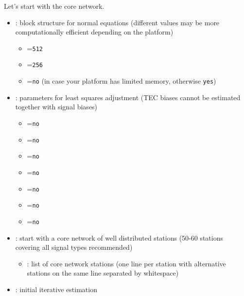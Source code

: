 Let's start with the core network.
\begin{itemize}
  \item {}: 
      block structure for normal equations (different values may be more computationally efficient depending on the platform)
  \begin{itemize}
    \item {}=\verb|512|
    \item {}=\verb|256|
    \item {}=\verb|no| (in case your platform has limited memory, otherwise \verb|yes|)  
  \end{itemize}
  \item {}: parameters
        for least squares adjustment (TEC biases cannot be estimated together with signal biases)
  \begin{itemize}
    \item {}=\verb|no|
    \item {}=\verb|no|
    \item {}=\verb|no|
    \item {}=\verb|no|
    \item {}=\verb|no|
    \item {}=\verb|no|
    \item {}=\verb|no|
  \end{itemize}
  \item {}: start with a
        core network of well distributed stations (50-60 stations covering all signal types recommended)
  \begin{itemize}
    \item {}: list of core network stations (one line per station
          with alternative stations on the same line separated by whitespace)
  \end{itemize}
  \item {}: initial iterative estimation

\end{itemize}
